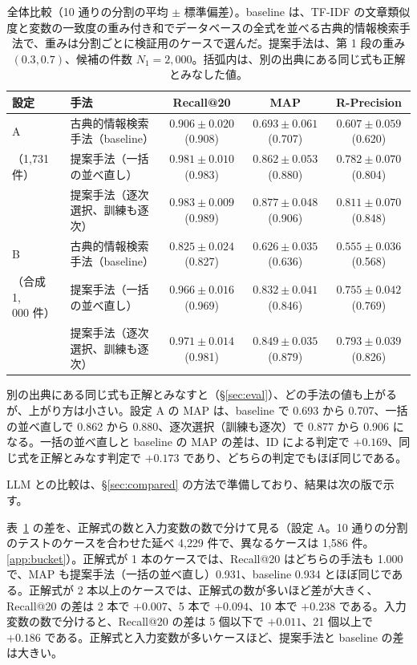 \documentclass[11pt,a4paper]{ltjsarticle}
\begin{document}
\begin{table}[t]\centering
\caption{全体比較（10 通りの分割の平均 $\pm$ 標準偏差）。baseline は、TF-IDF の文章類似度と変数の一致度の重み付き和でデータベースの全式を並べる古典的情報検索手法で、重みは分割ごとに検証用のケースで選んだ。提案手法は、第 1 段の重み $(0.3, 0.7)$、候補の件数 $N_1 = 2{,}000$。括弧内は、別の出典にある同じ式も正解とみなした値。}
\label{tab:overall}
\footnotesize
\setlength{\tabcolsep}{2pt}
\begin{tabular}{@{}llccc@{}}
\toprule
設定 & 手法 & Recall@20 & MAP & R-Precision \\
\midrule
A & 古典的情報検索手法（baseline） & $0.906 \pm 0.020$ (0.908) & $0.693 \pm 0.061$ (0.707) & $0.607 \pm 0.059$ (0.620) \\
（1{,}731 件） & 提案手法（一括の並べ直し） & $0.981 \pm 0.010$ (0.983) & $0.862 \pm 0.053$ (0.880) & $0.782 \pm 0.070$ (0.804) \\
 & 提案手法（逐次選択、訓練も逐次） & $\mathbf{0.983 \pm 0.009}$ (0.989) & $\mathbf{0.877 \pm 0.048}$ (0.906) & $\mathbf{0.811 \pm 0.070}$ (0.848) \\
\midrule
B & 古典的情報検索手法（baseline） & $0.825 \pm 0.024$ (0.827) & $0.626 \pm 0.035$ (0.636) & $0.555 \pm 0.036$ (0.568) \\
（合成 1{,}000 件） & 提案手法（一括の並べ直し） & $0.966 \pm 0.016$ (0.969) & $0.832 \pm 0.041$ (0.846) & $0.755 \pm 0.042$ (0.769) \\
 & 提案手法（逐次選択、訓練も逐次） & $\mathbf{0.971 \pm 0.014}$ (0.981) & $\mathbf{0.849 \pm 0.035}$ (0.879) & $\mathbf{0.793 \pm 0.039}$ (0.826) \\
\bottomrule
\end{tabular}
\end{table}

別の出典にある同じ式も正解とみなすと（\S\ref{sec:eval}）、どの手法の値も上がるが、上がり方は小さい。設定 A の MAP は、baseline で 0.693 から 0.707、一括の並べ直しで 0.862 から 0.880、逐次選択（訓練も逐次）で 0.877 から 0.906 になる。一括の並べ直しと baseline の MAP の差は、ID による判定で $+0.169$、同じ式を正解とみなす判定で $+0.173$ であり、どちらの判定でもほぼ同じである。

LLM との比較は、\S\ref{sec:compared} の方法で準備しており、結果は次の版で示す。

表~\ref{tab:overall} の差を、正解式の数と入力変数の数で分けて見る（設定 A。10 通りの分割のテストのケースを合わせた延べ 4{,}229 件で、異なるケースは 1{,}586 件。\ref{app:bucket}）。正解式が 1 本のケースでは、Recall@20 はどちらの手法も 1.000 で、MAP も提案手法（一括の並べ直し）0.931、baseline 0.934 とほぼ同じである。正解式が 2 本以上のケースでは、正解式の数が多いほど差が大きく、Recall@20 の差は 2 本で $+0.007$、5 本で $+0.094$、10 本で $+0.238$ である。入力変数の数で分けると、Recall@20 の差は 5 個以下で $+0.011$、21 個以上で $+0.186$ である。正解式と入力変数が多いケースほど、提案手法と baseline の差は大きい。
\end{document}
